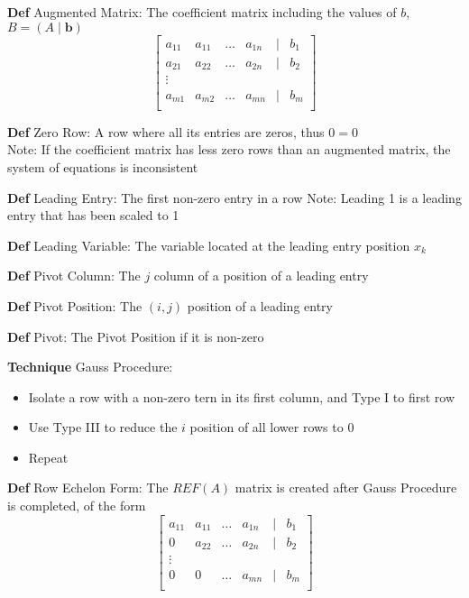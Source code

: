 \documentclass[11pt,notitlepage]{report}
\newcommand{\tbf}[1]{\textbf{#1}}
\begin{document}
\textbf{Def} Augmented Matrix: The coefficient matrix including the values of $b$, $B = (A \mid \tbf b)$
$$\begin{bmatrix}
a_{11} & a_{11} & \dots & a_{1n} & \mid &b_1\\
a_{21} & a_{22} & \dots & a_{2n} & \mid &b_2\\
\vdots\\
a_{m1} & a_{m2} & \dots & a_{mn} & \mid &b_m\\
\end{bmatrix}$$

\textbf{Def} Zero Row: A row where all its entries are zeros, thus $0 = 0$\\
\hspace*{5mm} Note: If the coefficient matrix has less zero rows than an augmented matrix, the system of equations is inconsistent



\textbf{Def} Leading Entry: The first non-zero entry in a row
\hspace*{5mm} Note: Leading 1 is a leading entry that has been scaled to 1

\textbf{Def} Leading Variable: The variable located at the leading entry position $x_k$

\textbf{Def} Pivot Column: The $j$ column of a position of a leading entry

\textbf{Def} Pivot Position: The $(i, j)$ position of a leading entry

\textbf{Def} Pivot: The Pivot Position if it is non-zero

\newpage

\textbf{Technique} Gauss Procedure: 
\begin{itemize}
    \item Isolate a row with a non-zero tern in its first column, and Type I to first row
    \item Use Type III to reduce the $i$ position of all lower rows to 0
    \item Repeat
\end{itemize}

\textbf{Def} Row Echelon Form: The $REF(A)$ matrix is created after Gauss Procedure is completed, of the form
$$\begin{bmatrix}
a_{11} & a_{11} & \dots & a_{1n} & \mid &b_1\\
0 & a_{22} & \dots & a_{2n} & \mid &b_2\\
\vdots\\
0 & 0 & \dots & a_{mn} & \mid &b_m\\
\end{bmatrix}$$
\end{document}
